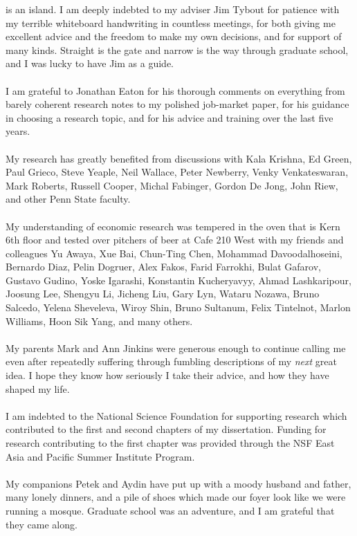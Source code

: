 
 is an island.  I am deeply indebted to my adviser Jim Tybout for patience with my terrible whiteboard handwriting in countless meetings, for both giving me excellent advice and the freedom to make my own decisions, and for support of many kinds.  Straight is the gate and narrow is the way through graduate school, and I was lucky to have Jim as a guide.\\
\vspace{1pt} \\
I am grateful to Jonathan Eaton for his thorough comments on everything from barely coherent research notes to my polished job-market paper, for his guidance in choosing a research topic, and for his advice and training over the last five years.\\
\vspace{1pt}\\
My research has greatly benefited from discussions with Kala Krishna, Ed Green, Paul Grieco, Steve Yeaple, Neil Wallace, Peter Newberry, Venky Venkateswaran, Mark Roberts, Russell Cooper, Michal Fabinger, Gordon De Jong, John Riew, and other Penn State faculty.\\
\vspace{1pt}\\
My understanding of economic research was tempered in the oven that is Kern 6th floor and tested over pitchers of beer at Cafe 210 West with my friends and colleagues Yu Awaya, Xue Bai, Chun-Ting Chen, Mohammad Davoodalhoseini, Bernardo Diaz, Pelin Dogruer, Alex Fakos, Farid Farrokhi, Bulat Gafarov, Gustavo Gudino, Yoske Igarashi, Konstantin Kucheryavyy, Ahmad Lashkaripour, Joosung Lee, Shengyu Li, Jicheng Liu, Gary Lyn, Wataru Nozawa, Bruno Salcedo, Yelena Sheveleva, Wiroy Shin, Bruno Sultanum, Felix Tintelnot, Marlon Williams, Hoon Sik Yang, and many others.\\
\vspace{1pt}\\
My parents Mark and Ann Jinkins were generous enough to continue calling me even after repeatedly suffering through fumbling descriptions of my \emph{next} great idea.  I hope they know how seriously I take their advice, and how they have shaped my life.\\
\vspace{1pt}\\
I am indebted to the National Science Foundation for supporting research which contributed to the first and second chapters of my dissertation.  Funding for research contributing to the first chapter was provided through the NSF East Asia and Pacific Summer Institute Program.\\
\vspace{1pt}\\
My companions Petek and Aydin have put up with a moody husband and father, many lonely dinners, and a pile of shoes which made our foyer look like we were running a mosque.  Graduate school was an adventure, and I am grateful that they came along.
